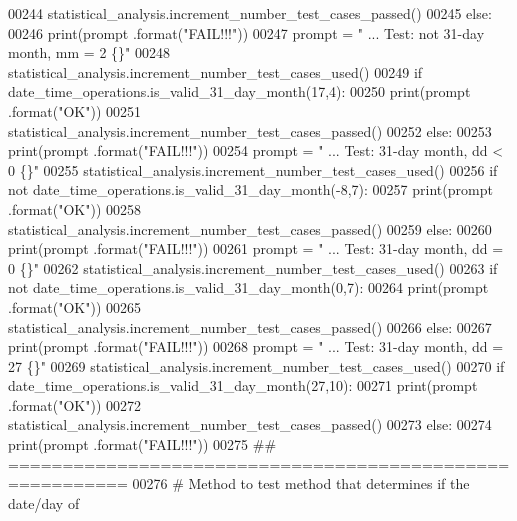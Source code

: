 \begin{DoxyCode}
00244             statistical\_analysis.increment\_number\_test\_cases\_passed()
00245         \textcolor{keywordflow}{else}:
00246             print(prompt .format(\textcolor{stringliteral}{"FAIL!!!"}))
00247         prompt = \textcolor{stringliteral}{"  ... Test: not 31-day month, mm = 2          \{\}"}
00248         statistical\_analysis.increment\_number\_test\_cases\_used()
00249         \textcolor{keywordflow}{if} date\_time\_operations.is\_valid\_31\_day\_month(17,4):
00250             print(prompt .format(\textcolor{stringliteral}{"OK"}))
00251             statistical\_analysis.increment\_number\_test\_cases\_passed()
00252         \textcolor{keywordflow}{else}:
00253             print(prompt .format(\textcolor{stringliteral}{"FAIL!!!"}))
00254         prompt = \textcolor{stringliteral}{"  ... Test: 31-day month, dd < 0              \{\}"}
00255         statistical\_analysis.increment\_number\_test\_cases\_used()
00256         \textcolor{keywordflow}{if} \textcolor{keywordflow}{not} date\_time\_operations.is\_valid\_31\_day\_month(-8,7):
00257             print(prompt .format(\textcolor{stringliteral}{"OK"}))
00258             statistical\_analysis.increment\_number\_test\_cases\_passed()
00259         \textcolor{keywordflow}{else}:
00260             print(prompt .format(\textcolor{stringliteral}{"FAIL!!!"}))
00261         prompt = \textcolor{stringliteral}{"  ... Test: 31-day month, dd = 0              \{\}"}
00262         statistical\_analysis.increment\_number\_test\_cases\_used()
00263         \textcolor{keywordflow}{if} \textcolor{keywordflow}{not} date\_time\_operations.is\_valid\_31\_day\_month(0,7):
00264             print(prompt .format(\textcolor{stringliteral}{"OK"}))
00265             statistical\_analysis.increment\_number\_test\_cases\_passed()
00266         \textcolor{keywordflow}{else}:
00267             print(prompt .format(\textcolor{stringliteral}{"FAIL!!!"}))
00268         prompt = \textcolor{stringliteral}{"  ... Test: 31-day month, dd = 27             \{\}"}
00269         statistical\_analysis.increment\_number\_test\_cases\_used()
00270         \textcolor{keywordflow}{if} date\_time\_operations.is\_valid\_31\_day\_month(27,10):
00271             print(prompt .format(\textcolor{stringliteral}{"OK"}))
00272             statistical\_analysis.increment\_number\_test\_cases\_passed()
00273         \textcolor{keywordflow}{else}:
00274             print(prompt .format(\textcolor{stringliteral}{"FAIL!!!"}))
00275     \textcolor{comment}{## =========================================================}
00276     \textcolor{comment}{#   Method to test method that determines if the date/day of}

\end{DoxyCode}
